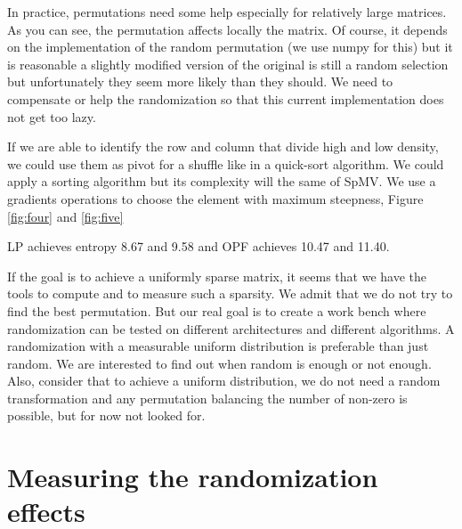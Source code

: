 \documentclass[manuscript,screen]{acmart}
\begin{document}

In practice, permutations need some help especially for relatively
large matrices. As you can see, the permutation affects locally the
matrix. Of course, it depends on the implementation of the random
permutation (we use numpy for this) but it is reasonable a slightly
modified version of the original is still a random selection but
unfortunately they seem more likely than they should. We need to
compensate or help the randomization so that this current
implementation does not get too lazy.

If we are able to identify the row and column that divide high and low
density, we could use them as pivot for a shuffle like in a quick-sort
algorithm. We could apply a sorting algorithm but its complexity will
the same of SpMV. We use a gradients operations to choose the element
with maximum steepness, Figure \ref{fig:four} and \ref{fig:five}

LP achieves entropy 8.67 and 9.58 and OPF achieves 10.47 and 11.40.



If the goal is to achieve a uniformly sparse matrix, it seems that we
have the tools to compute and to measure such a sparsity. We admit
that we do not try to find the best permutation. But our real goal is
to create a work bench where randomization can be tested on different
architectures and different algorithms. A randomization with a
measurable uniform distribution is preferable than just random. We are
interested to find out when random is enough or not enough. Also,
consider that to achieve a uniform distribution, we do not need a
random transformation and any permutation balancing the number of
non-zero is possible, but for now not looked for.

\section{Measuring the randomization effects}
\label{sec:measuring}
\end{document}
